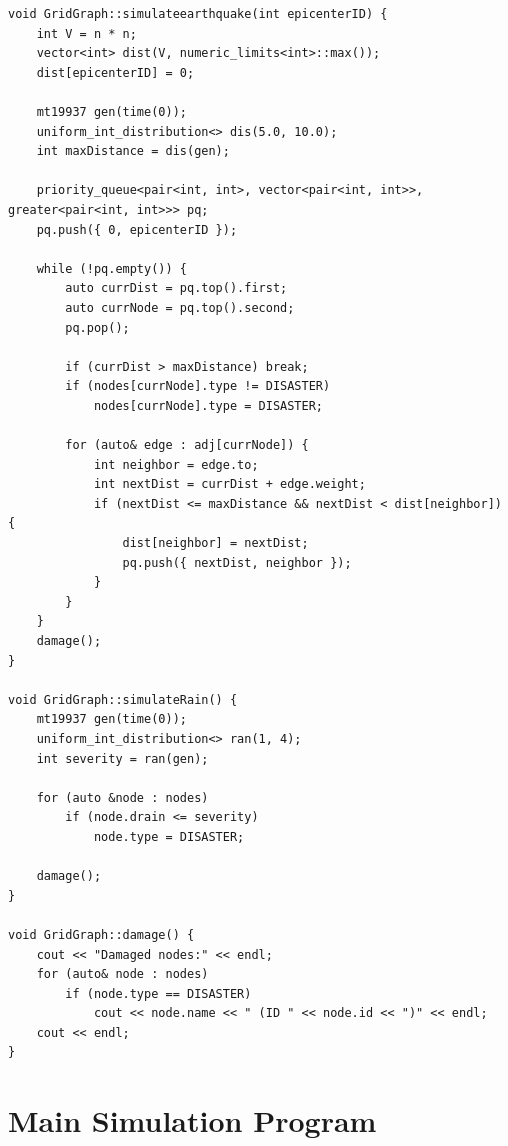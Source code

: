 \documentclass[12pt,a4paper]{report}
\begin{document}
\begin{lstlisting}[style=cpp, caption={GridGraph.cpp – Graph Class Implementation}]
void GridGraph::simulateearthquake(int epicenterID) {
    int V = n * n;
    vector<int> dist(V, numeric_limits<int>::max());
    dist[epicenterID] = 0;

    mt19937 gen(time(0));
    uniform_int_distribution<> dis(5.0, 10.0);
    int maxDistance = dis(gen);

    priority_queue<pair<int, int>, vector<pair<int, int>>, greater<pair<int, int>>> pq;
    pq.push({ 0, epicenterID });

    while (!pq.empty()) {
        auto currDist = pq.top().first;
        auto currNode = pq.top().second;
        pq.pop();

        if (currDist > maxDistance) break;
        if (nodes[currNode].type != DISASTER)
            nodes[currNode].type = DISASTER;

        for (auto& edge : adj[currNode]) {
            int neighbor = edge.to;
            int nextDist = currDist + edge.weight;
            if (nextDist <= maxDistance && nextDist < dist[neighbor]) {
                dist[neighbor] = nextDist;
                pq.push({ nextDist, neighbor });
            }
        }
    }
    damage();
}

void GridGraph::simulateRain() {
    mt19937 gen(time(0));
    uniform_int_distribution<> ran(1, 4);
    int severity = ran(gen);

    for (auto &node : nodes)
        if (node.drain <= severity)
            node.type = DISASTER;

    damage();
}

void GridGraph::damage() {
    cout << "Damaged nodes:" << endl;
    for (auto& node : nodes)
        if (node.type == DISASTER)
            cout << node.name << " (ID " << node.id << ")" << endl;
    cout << endl;
}
\end{lstlisting}
\section{Main Simulation Program}
\end{document}
